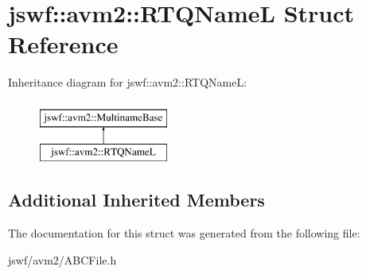 \hypertarget{structjswf_1_1avm2_1_1_r_t_q_name_l}{\section{jswf\+:\+:avm2\+:\+:R\+T\+Q\+Name\+L Struct Reference}
\label{structjswf_1_1avm2_1_1_r_t_q_name_l}
}
Inheritance diagram for jswf\+:\+:avm2\+:\+:R\+T\+Q\+Name\+L\+:\begin{figure}[H]
\begin{center}
\leavevmode
\includegraphics[height=2.000000cm]{structjswf_1_1avm2_1_1_r_t_q_name_l}
\end{center}
\end{figure}
\subsection*{Additional Inherited Members}


The documentation for this struct was generated from the following file\+:\begin{DoxyCompactItemize}
\item 
jswf/avm2/A\+B\+C\+File.\+h\end{DoxyCompactItemize}

